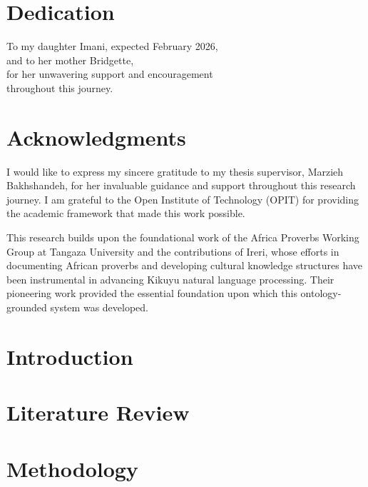 \documentclass[12pt]{report}
\begin{document}
\chapter*{Dedication}
To my daughter Imani, expected February 2026,\\
and to her mother Bridgette,\\
for her unwavering support and encouragement\\
throughout this journey.

\chapter*{Acknowledgments}
I would like to express my sincere gratitude to my thesis supervisor, Marzieh Bakhshandeh, for her invaluable guidance and support throughout this research journey. I am grateful to the Open Institute of Technology (OPIT) for providing the academic framework that made this work possible.

This research builds upon the foundational work of the Africa Proverbs Working Group at Tangaza University and the contributions of Ireri, whose efforts in documenting African proverbs and developing cultural knowledge structures have been instrumental in advancing Kikuyu natural language processing. Their pioneering work provided the essential foundation upon which this ontology-grounded system was developed.

\newpage
\tableofcontents
\newpage
\listoftables
\newpage
\listoffigures

\clearpage
{} %
\setcounter{page}{1}   %

\chapter{Introduction}


\chapter{Literature Review}


\chapter{Methodology}

\end{document}
